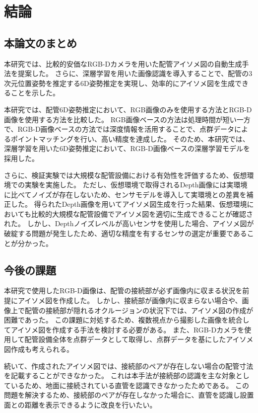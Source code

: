 ﻿\chapter{結論}

\section{本論文のまとめ}
本研究では、比較的安価なRGB-Dカメラを用いた配管アイソメ図の自動生成手法を提案した。
さらに、深層学習を用いた画像認識を導入することで、配管の3次元位置姿勢を推定する6D姿勢推定を実現し、効率的にアイソメ図を生成できることを示した。

本研究では、配管6D姿勢推定において、RGB画像のみを使用する方法とRGB-D画像を使用する方法を比較した。
RGB画像ベースの方法は処理時間が短い一方で、RGB-D画像ベースの方法では深度情報を活用することで、点群データによるポイントマッチングを行い、高い精度を達成した。
そのため、本研究では、深層学習を用いた6D姿勢推定において、RGB-D画像ベースの深層学習モデルを採用した。

さらに、検証実験では大規模な配管設備における有効性を評価するため、仮想環境での実験を実施した。
ただし、仮想環境で取得されるDepth画像には実環境に比べてノイズが存在しないため、センサモデルを導入して実環境との差異を補正した。
得られたDepth画像を用いてアイソメ図生成を行った結果、仮想環境においても比較的大規模な配管設備でアイソメ図を適切に生成できることが確認された。
しかし、Depthノイズレベルが高いセンサを使用した場合、アイソメ図が破綻する問題が発生したため、適切な精度を有するセンサの選定が重要であることが分かった。

\section{今後の課題}
本研究で使用したRGB-D画像は、配管の接続部が必ず画像内に収まる状況を前提にアイソメ図を作成した。
しかし、接続部が画像内に収まらない場合や、画像上で配管の接続部が隠れるオクルージョンの状況下では、アイソメ図の作成が困難であった。
この課題に対処するため、複数視点から撮影した画像を統合してアイソメ図を作成する手法を検討する必要がある。
また、RGB-Dカメラを使用して配管設備全体を点群データとして取得し、点群データを基にしたアイソメ図作成も考えられる。

続いて、作成されたアイソメ図では、接続部のペアが存在しない場合の配管寸法を記載することができなかった。
これは本手法が接続部の認識を主な対象としているため、地面に接続されている直管を認識できなかったためである。
この問題を解決するため、接続部のペアが存在しなかった場合に、直管を認識し設置面との距離を表示できるように改良を行いたい。
